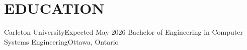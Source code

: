 \section {\textbf {\large EDUCATION}}
    \resumeSubHeadingListStart

    \resumeSubheading
    {Carleton University}{Expected May 2026}
    {Bachelor of Engineering in Computer Systems Engineering}{Ottawa, Ontario}

    \resumeSubHeadingListEnd